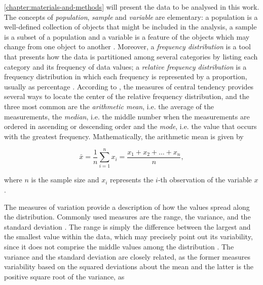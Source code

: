 \autoref{chapter:materials-and-methods} will present the data to be analysed in this work. The concepts of \emph{population}, \emph{sample} and \emph{variable} are elementary: a population is a well-defined collection of objects that might be included in the analysis, a sample is a subset of a population and a variable is a feature of the objects which may change from one object to another \cite{devore2011probability}. Moreover, a \emph{frequency distribution} is a tool that presents how the data is partitioned among several categories by listing each category and its frequency of data values; a \emph{relative frequency distribution} is a frequency distribution in which each frequency is represented by a proportion, usually as percentage \cite{triola2017elementary}. According to , the measures of central tendency provides several ways to locate the center of the relative frequency distribution, and the three most common are the \emph{arithmetic mean}, i.e. the average of the measurements, the \emph{median}, i.e. the middle number when the measurements are ordered in ascending or descending order and the \emph{mode}, i.e. the value that occurs with the greatest frequency. Mathematically, the arithmetic mean is given by

\begin{equation}
\label{eqn:arithmetic_mean}
\bar{x} = \frac{1}{n} \sum_{i=1}^{n} x_{i} = \frac{x_{1} + x_{2} + \dots + x_{n}}{n},
\end{equation}

\noindent where $n$ is the sample size and $x_{i}$ represents the $i$-th observation of the variable $x$ \cite{zwillinger1999crc}.


The measures of variation provide a description of how the values spread along the distribution. Commonly used measures are the range, the variance, and the standard deviation \cite{mendenhall2016statistics}. The range is simply the difference between the largest and the smallest value within the data, which may precisely point out its variability, since it does not comprise the middle values among the distribution \cite{devore2011probability}. The variance and the standard deviation are closely related, as the former measures variability based on the squared deviations about
the mean and the latter is the positive square root of the variance, as

